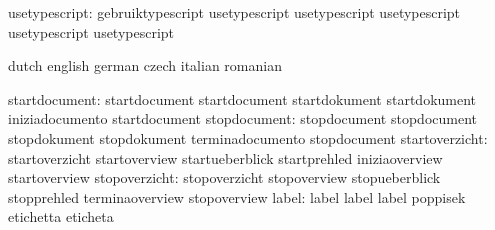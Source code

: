   usetypescript: gebruiktypescript          usetypescript
                 usetypescript              usetypescript
                 usetypescript              usetypescript

\stopcommands




\startcommands                    dutch                            english
                                  german                           czech
                                  italian                          romanian

                   startdocument: startdocument                    startdocument
                                  startdokument                    startdokument
                                  iniziadocumento                  startdocument
                    stopdocument: stopdocument                     stopdocument
                                  stopdokument                     stopdokument
                                  terminadocumento                 stopdocument
                  startoverzicht: startoverzicht                   startoverview
                                  startueberblick                  startprehled
                                  iniziaoverview                   startoverview %
                   stopoverzicht: stopoverzicht                    stopoverview
                                  stopueberblick                   stopprehled
                                  terminaoverview                  stopoverview
                           label: label                            label
                                  label                            poppisek
                                  etichetta                        eticheta
%
%
